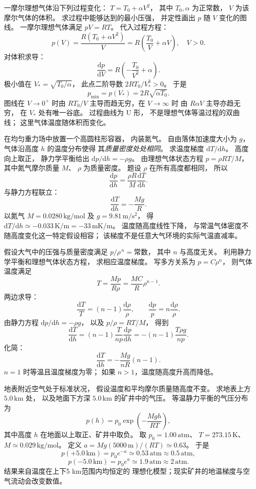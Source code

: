 一摩尔理想气体沿下列过程变化：
$T=T_0+\alpha V^2$，
其中 $T_0,\alpha$ 为正常数，
$V$ 为该摩尔气体的体积。
求过程中能够达到的最小压强，
并定性画出 $p$ 随 $V$ 变化的图线。
\exsolution
一摩尔理想气体满足 $pV=RT$。
代入过程方程：
\[
p(V)=\frac{R(T_0+\alpha V^2)}{V}
=R\left(\frac{T_0}{V}+\alpha V\right),
\quad V>0.
\]
对体积求导：
\[
\frac{\mathrm dp}{\mathrm dV}
=R\left(-\frac{T_0}{V^2}+\alpha\right).
\]
极小值在
$V_*=\sqrt{T_0/\alpha}$，
此点二阶导数
$2RT_0/V_*^3>0$。
于是
\[
\boxed{p_{\min}=p(V_*)
=2R\sqrt{\alpha T_0}}.
\]
图线在 $V\to0^+$ 时由 $RT_0/V$
主导而趋无穷，在 $V\to\infty$ 时
由 $R\alpha V$ 主导亦趋无穷，
在 $V_*$ 处有唯一谷底。
\excheck 过程曲线为 U 形，
不是理想气体等温过程的双曲线；
这里气体温度随体积而变化。

在均匀重力场中放置一个高圆柱形容器，
内装氮气。
自由落体加速度大小为 $g$，
气体沿高度 $h$ 的温度分布使得
其\emph{质量密度处处相同}。
求温度梯度 $\mathrm dT/\mathrm dh$。
\exsolution
高度向上取正，
静力学平衡给出
$\mathrm dp/\mathrm dh=-\rho g$。
由理想气体状态方程
$p=\rho RT/M$，
其中氮气摩尔质量 $M$、
$\rho$ 为质量密度。
题设 $\rho$ 在所有高度都相同，
所以
\[
\frac{\mathrm dp}{\mathrm dh}
=\frac{\rho R}{M}\frac{\mathrm dT}{\mathrm dh}.
\]
与静力方程联立：
\[
\boxed{\frac{\mathrm dT}{\mathrm dh}
=-\frac{Mg}{R}}.
\]
以氮气 $M=0.0280\,\mathrm{kg/mol}$
及 $g=9.81\,\mathrm{m/s^2}$，
得
$\boxed{\mathrm dT/\mathrm dh
\simeq-0.033\,\mathrm{K/m}=-33\,\mathrm{mK/m}}$。
\excheck 温度随高度线性下降，
与常温气体密度不随高度变化这一特定假设相容；
该梯度不是任意大气环境的实际气温直减率。

假设大气中的压强与质量密度满足
$p/\rho^{\,n}=\text{常数}$，
其中 $n$ 与高度无关。
利用静力学平衡和理想气体状态方程，
求相应温度梯度。
\exsolution
写多方关系为 $p=C\rho^n$，
则气体温度满足
\[
T=\frac{Mp}{R\rho}
=\frac{MC}{R}\rho^{n-1}.
\]
两边求导：
\[
\frac{\mathrm dT}{T}
=(n-1)\frac{\mathrm d\rho}{\rho},
\qquad
\frac{\mathrm dp}{p}=n\frac{\mathrm d\rho}{\rho}.
\]
由静力方程
$\mathrm dp/\mathrm dh=-\rho g$，
以及 $p/\rho=RT/M$，
得到
\[
\frac{\mathrm dT}{\mathrm dh}
=(n-1)\frac{T}{n p}\frac{\mathrm dp}{\mathrm dh}
=-(n-1)\frac{T\rho g}{np}.
\]
化简：
\[
\boxed{\frac{\mathrm dT}{\mathrm dh}
=-\frac{Mg}{nR}(n-1)}.
\]
\excheck $n=1$ 时等温且温度梯度为零；
如果 $n>1$，温度随高度升高而降低。

地表附近空气处于标准状况，
假设温度和平均摩尔质量随高度不变。
求地表上方 $5.0\,\mathrm{km}$ 处，
以及地面下方深 $5.0\,\mathrm{km}$ 的矿井中的气压。
\exsolution
等温静力平衡的气压分布为
\[
p(h)=p_0\exp\left(-\frac{Mgh}{RT}\right),
\]
其中高度 $h$ 在地面以上取正、矿井中取负。
取 $p_0=1.00\,\mathrm{atm}$、
$T=273.15\,\mathrm K$、
$M\simeq0.029\,\mathrm{kg/mol}$。
定义
$a=M g(5000\,\mathrm m)/(RT)\simeq0.63$。
于是
\[
\boxed{p(+5.0\,\mathrm{km})
=p_0e^{-a}\simeq0.53\,\mathrm{atm}\approx0.5\,\mathrm{atm}},
\]
\[
\boxed{p(-5.0\,\mathrm{km})
=p_0e^{a}\simeq1.9\,\mathrm{atm}\approx2\,\mathrm{atm}}.
\]
\excheck 结果来自温度在上下5 km范围内均恒定的
理想化模型；现实矿井的地温梯度与空气流动会改变数值。

